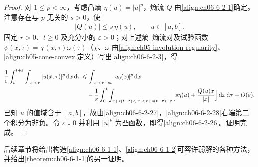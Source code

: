 \documentclass[../../main.tex]{subfiles}
\begin{document}
\begin{proof}
对 $1\leqslant p<\infty$，考虑凸熵 $\eta(u)=|u|^{p}$，熵流 $Q$ 由\eqref{align:ch06-6-2-1}确定。注意存在与 $p$ 无关的 $s>0$，使
\begin{align}
|Q(u)|\leqslant s\,\eta(u),\qquad u\in[a,b].
\label{align:ch06-6-2-27}
\end{align}
固定 $r>0$、$t\geqslant 0$ 及充分小的 $\varepsilon>0$；对上述熵--熵流对及试验函数 $\psi(x,\tau)=\chi(x,\tau)\omega(\tau)$（$\chi$、$\omega$ 由\eqref{align:ch05-involution-regularity}、\eqref{align:ch05-cone-convex}定义）写出\eqref{align:ch06-6-2-3}，得

\begin{align}
\frac{1}{\varepsilon}\int_{t}^{t+\varepsilon}\int_{|x|<r}|u(x,\tau)|^{p}\,\mathrm{d}x\,\mathrm{d}\tau
&\leqslant\int_{|x|<r+st}|u_{0}(x)|^{p}\,\mathrm{d}x\notag\\
&\quad-\frac{1}{\varepsilon}\int_{0}^{t}\int_{r+s(t-\tau)<|x|<r+s(t-\tau)+\varepsilon}\Bigl{[}s\eta(u)+\frac{Q(u)x}{|x|}\Bigr{]}\,\mathrm{d}x\,\mathrm{d}\tau+O(\varepsilon).
\label{align:ch06-6-2-28}
\end{align}
已知 $u$ 的值域含于 $[a,b]$，故由\eqref{align:ch06-6-2-27}，\eqref{align:ch06-6-2-28}右端第二个积分为非负。令 $\varepsilon\downarrow 0$ 并利用 $|u|^{p}$ 为凸函数，即得\eqref{align:ch06-6-2-26}。证明完成。
\end{proof}

后续章节将给出构造\eqref{align:ch06-6-1-1}、\eqref{align:ch06-6-1-2}可容许弱解的各种方法，并给出\cref{theorem:ch06-6-1-1}的另一证明。
\end{document}
